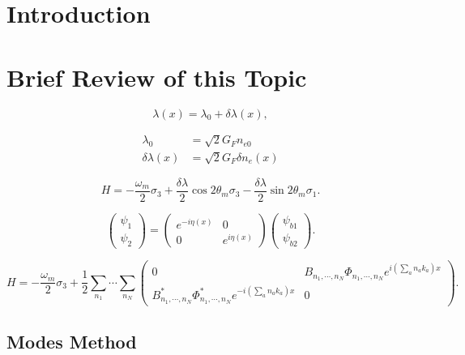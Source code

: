 \documentclass[%
preprint,
 amsmath,amssymb,
 aps,
]{revtex4-1}
\begin{document}

\section{\label{introduction}Introduction}


\section{\label{review}Brief Review of this Topic}

\begin{equation}
    \lambda(x) = \lambda_0 + \delta \lambda (x),
\end{equation}

\begin{align}
    \lambda_0 &= \sqrt{2}G_F n_{e0} \\
    \delta \lambda(x) &= \sqrt{2}G_F \delta n_e(x)
\end{align}

\begin{equation}
    H = - \frac{\omega_m}{2} \sigma_3 + \frac{\delta \lambda}{2} \cos 2\theta_m \sigma_3 - \frac{\delta \lambda}{2} \sin 2 \theta_m \sigma_1.
\end{equation}


\begin{equation}
\begin{pmatrix} \psi_1 \\ \psi_2 \end{pmatrix} = \begin{pmatrix} e^{-i \eta (x)} & 0 \\  0 & e^{i \eta (x)}  \end{pmatrix} \begin{pmatrix} \psi_{b1} \\ \psi_{b2} \end{pmatrix}.
\end{equation}


\begin{equation}
H = -\frac{\omega_m}{2} \sigma_3 + \frac{1}{2} \sum_{n_1} \cdots \sum_{n_N} \begin{pmatrix} 0 & B_{n_1,\cdots,n_N} \Phi_{n_1,\cdots, n_N} e^{i \left( \sum_{a} n_a k_a   \right)x} \\ B_{n_1,\cdots,n_N}^* \Phi_{n_1,\cdots, n_N}^* e^{-i \left( \sum_{a} n_a k_a   \right)x} & 0 \end{pmatrix}.
\end{equation}

\subsection{Modes Method}
\end{document}
